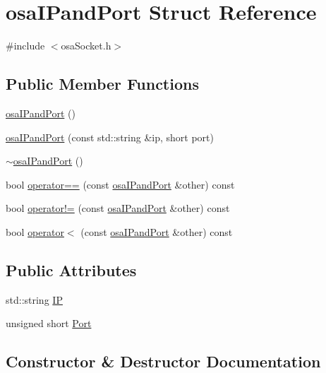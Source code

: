 \hypertarget{structosa_i_pand_port}{}\section{osa\+I\+Pand\+Port Struct Reference}
\label{structosa_i_pand_port}


{\ttfamily \#include $<$osa\+Socket.\+h$>$}

\subsection*{Public Member Functions}
\begin{DoxyCompactItemize}
\item 
\hyperlink{structosa_i_pand_port_a5f824e2392908653bc45229f420c968b}{osa\+I\+Pand\+Port} ()
\item 
\hyperlink{structosa_i_pand_port_a9e4bc64f6b38fcaa135d9627970bef5c}{osa\+I\+Pand\+Port} (const std\+::string \&ip, short port)
\item 
\hyperlink{structosa_i_pand_port_ac922cdf0b1b42a6930482674a85505e3}{$\sim$osa\+I\+Pand\+Port} ()
\item 
bool \hyperlink{structosa_i_pand_port_a54dc51a33e3cf39b146ee1a7e65f74fa}{operator==} (const \hyperlink{structosa_i_pand_port}{osa\+I\+Pand\+Port} \&other) const 
\item 
bool \hyperlink{structosa_i_pand_port_a5a42cd75d716c41e26deb9be8f2e5708}{operator!=} (const \hyperlink{structosa_i_pand_port}{osa\+I\+Pand\+Port} \&other) const 
\item 
bool \hyperlink{structosa_i_pand_port_aabc2dcbeb95213d43105a4eea91537ab}{operator$<$} (const \hyperlink{structosa_i_pand_port}{osa\+I\+Pand\+Port} \&other) const 
\end{DoxyCompactItemize}
\subsection*{Public Attributes}
\begin{DoxyCompactItemize}
\item 
std\+::string \hyperlink{structosa_i_pand_port_aae6975367437b9d6f2f031696e9d84aa}{I\+P}
\item 
unsigned short \hyperlink{structosa_i_pand_port_af453d309ea5394037e662725ac6dee10}{Port}
\end{DoxyCompactItemize}


\subsection{Constructor \& Destructor Documentation}
\hypertarget{structosa_i_pand_port_a5f824e2392908653bc45229f420c968b}{}
